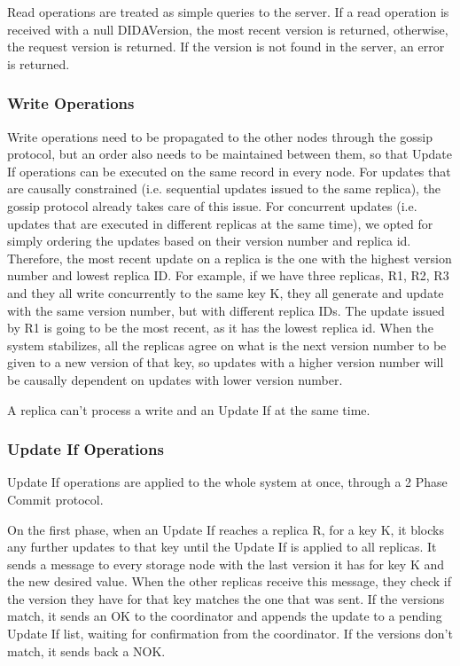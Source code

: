 \documentclass[times, 10pt,twocolumn]{article}
\begin{document}
Read operations are treated as simple queries to the server. If a read operation is received with a null DIDAVersion, the most recent version is returned,
otherwise, the request version is returned. If the version is not found in the server, an error is returned.

\subsubsection{Write Operations}    
Write operations need to be propagated to the other nodes through the gossip protocol, but an order also needs to be maintained between them, so that Update If operations
can be executed on the same record in every node. For updates that are causally constrained (i.e. sequential updates issued to the same replica), the gossip protocol already takes care of this issue. 
For concurrent updates (i.e. updates that are executed in different replicas at the same time), we opted for simply ordering the updates based on their version number and replica id. Therefore, the most recent update
on a replica is the one with the highest version number and lowest replica ID. For example, if we have three replicas, R1, R2, R3 and they all write concurrently to the same key K, they all generate and update with the
same version number, but with different replica IDs. The update issued by R1 is going to be the most recent, as it has the lowest replica id. When the system stabilizes, all the replicas agree on what is the next version 
number to be given to a new version of that key, so updates with a higher version number will be causally dependent on updates with lower version number.

A replica can't process a write and an Update If at the same time.

\subsubsection{Update If Operations}

Update If operations are applied to the whole system at once, through a 2 Phase Commit protocol. 

On the first phase, when an Update If reaches a replica R, for a key K, it blocks any further updates to that key until the Update If is applied to all replicas. It sends a message to 
every storage node with the last version it has for key K and the new desired value. When the other replicas receive this message, they check if the version they have for that key 
matches the one that was sent. If the versions match, it sends an OK to the coordinator and appends the update to a pending Update If list, waiting for confirmation from the coordinator.
If the versions don't match, it sends back a NOK.
\end{document}
